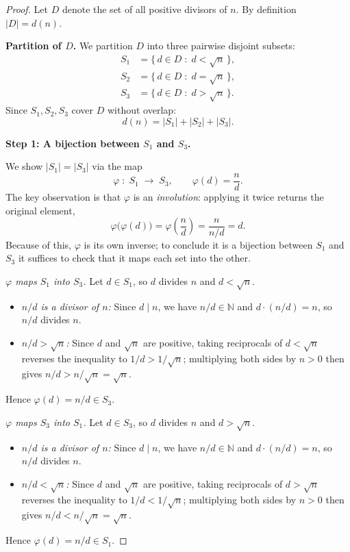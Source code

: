\documentclass[12pt]{article}
\theoremstyle{remark}
\begin{document}
\begin{proof}
Let $D$ denote the set of all positive divisors of $n$.  By definition
$|D| = d(n)$.

\smallskip
\noindent\textbf{Partition of $D$.}\;
We partition $D$ into three pairwise disjoint subsets:
\begin{align*}
    S_1 &= \bigl\{\, d \in D \;:\; d < \sqrt{n} \,\bigr\}, \\
    S_2 &= \bigl\{\, d \in D \;:\; d = \sqrt{n} \,\bigr\}, \\
    S_3 &= \bigl\{\, d \in D \;:\; d > \sqrt{n} \,\bigr\}.
\end{align*}
Since $S_1, S_2, S_3$ cover $D$ without overlap:
\[
    d(n) = |S_1| + |S_2| + |S_3|.
\]

\bigskip
\noindent\textbf{Step 1: A bijection between $S_1$ and $S_3$.}

We show $|S_1| = |S_3|$ via the map
\[
    \varphi \;:\; S_1 \;\longrightarrow\; S_3, \qquad \varphi(d) = \frac{n}{d}.
\]
The key observation is that $\varphi$ is an \emph{involution}: applying it
twice returns the original element,
\[
    \varphi\bigl(\varphi(d)\bigr) = \varphi\!\left(\frac{n}{d}\right)
    = \frac{n}{n/d} = d.
\]
Because of this, $\varphi$ is its own inverse; to conclude it is a bijection
between $S_1$ and $S_3$ it suffices to check that it maps each set into the
other.

\medskip
\emph{$\varphi$ maps $S_1$ into $S_3$.}\;
Let $d \in S_1$, so $d$ divides $n$ and $d < \sqrt{n}$.
\begin{itemize}
    \item \emph{$n/d$ is a divisor of $n$:} Since $d \mid n$, we have
          $n/d \in \mathbb{N}$ and $d \cdot (n/d) = n$, so $n/d$ divides $n$.
    \item \emph{$n/d > \sqrt{n}$:} Since $d$ and $\sqrt{n}$ are positive,
          taking reciprocals of $d < \sqrt{n}$ reverses the inequality to
          $1/d > 1/\sqrt{n}$; multiplying both sides by $n > 0$ then gives
          $n/d > n/\sqrt{n} = \sqrt{n}$.
\end{itemize}
Hence $\varphi(d) = n/d \in S_3$.

\medskip
\emph{$\varphi$ maps $S_3$ into $S_1$.}\;
Let $d \in S_3$, so $d$ divides $n$ and $d > \sqrt{n}$.
\begin{itemize}
    \item \emph{$n/d$ is a divisor of $n$:} Since $d \mid n$, we have
          $n/d \in \mathbb{N}$ and $d \cdot (n/d) = n$, so $n/d$ divides $n$.
    \item \emph{$n/d < \sqrt{n}$:} Since $d$ and $\sqrt{n}$ are positive,
          taking reciprocals of $d > \sqrt{n}$ reverses the inequality to
          $1/d < 1/\sqrt{n}$; multiplying both sides by $n > 0$ then gives
          $n/d < n/\sqrt{n} = \sqrt{n}$.
\end{itemize}
Hence $\varphi(d) = n/d \in S_1$.


\end{proof}
\end{document}
